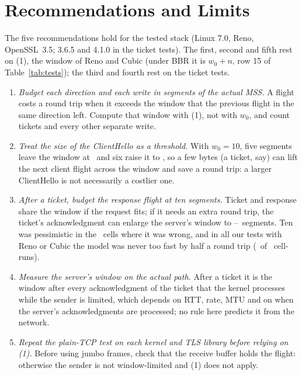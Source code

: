 \documentclass[sigconf,9pt,nonacm]{acmart}
\begin{document}
\section{Recommendations and Limits}
The five recommendations hold for the tested stack (Linux 7.0, Reno, OpenSSL~3.5; 3.6.5 and 4.1.0 in the ticket tests). The first, second and fifth rest on (1), the window of Reno and Cubic (under BBR it is $w_0+n$, row 15 of Table~\ref{tab:tests}); the third and fourth rest on the ticket tests.
\begin{enumerate}
\item \emph{Budget each direction and each write in segments of the actual MSS.} A flight costs a round trip when it exceeds the window that the previous flight in the same direction left. Compute that window with (1), not with $w_0$, and count tickets and every other separate write.
\item \emph{Treat the size of the ClientHello as a threshold.} With $w_0=10$, five segments leave the window at \WFive\ and six raise it to \WSix, so a few bytes (a ticket, say) can lift the next client flight across the window and save a round trip: a larger ClientHello is not necessarily a costlier one.
\item \emph{After a ticket, budget the response flight at ten segments.} Ticket and response share the window if the request fits; if it needs an extra round trip, the ticket's acknowledgment can enlarge the server's window to \SrvWinLo--\SrvWinHi\ segments. Ten was pessimistic in the \DBothWrong\ cells where it was wrong, and in all our tests with Reno or Cubic the model was never too fast by half a round trip (\OsFast\ of \OsRuns\ cell-runs).
\item \emph{Measure the server's window on the actual path.} After a ticket it is the window after every acknowledgment of the ticket that the kernel processes while the sender is limited, which depends on RTT, rate, MTU and on when the server's acknowledgments are processed; no rule here predicts it from the network.
\item \emph{Repeat the plain-TCP test on each kernel and TLS library before relying on (1).} Before using jumbo frames, check that the receive buffer holds the flight: otherwise the sender is not window-limited and (1) does not apply.
\end{enumerate}
\end{document}
